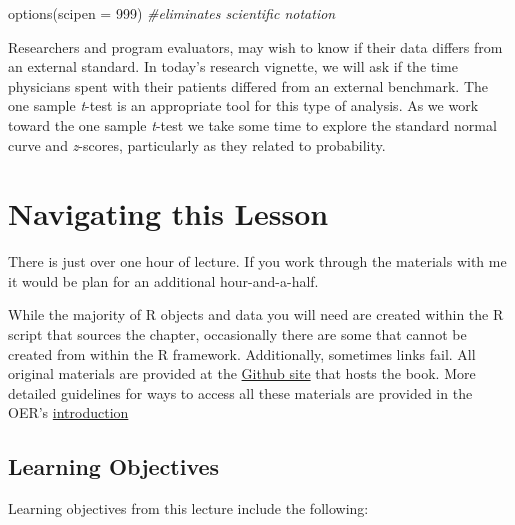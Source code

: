 \documentclass[
  11pt,
]{book}
\newenvironment{Shaded}{\begin{snugshade}}{\end{snugshade}}
\newcommand{\AttributeTok}[1]{\textcolor[rgb]{0.77,0.63,0.00}{#1}}
\newcommand{\CommentTok}[1]{\textcolor[rgb]{0.56,0.35,0.01}{\textit{#1}}}
\newcommand{\DecValTok}[1]{\textcolor[rgb]{0.00,0.00,0.81}{#1}}
\newcommand{\FunctionTok}[1]{\textcolor[rgb]{0.00,0.00,0.00}{#1}}
\newcommand{\NormalTok}[1]{#1}
\begin{document}
\begin{Shaded}
\begin{Highlighting}[]
\FunctionTok{options}\NormalTok{(}\AttributeTok{scipen =} \DecValTok{999}\NormalTok{)  }\CommentTok{\#eliminates scientific notation}
\end{Highlighting}
\end{Shaded}

Researchers and program evaluators, may wish to know if their data differs from an external standard. In today's research vignette, we will ask if the time physicians spent with their patients differed from an external benchmark. The one sample \emph{t}-test is an appropriate tool for this type of analysis. As we work toward the one sample \emph{t}-test we take some time to explore the standard normal curve and \emph{z}-scores, particularly as they related to probability.

\hypertarget{navigating-this-lesson-2}{%
\section{Navigating this Lesson}\label{navigating-this-lesson-2}}

There is just over one hour of lecture. If you work through the materials with me it would be plan for an additional hour-and-a-half.

While the majority of R objects and data you will need are created within the R script that sources the chapter, occasionally there are some that cannot be created from within the R framework. Additionally, sometimes links fail. All original materials are provided at the \href{https://github.com/lhbikos/ReCenterPsychStats}{Github site} that hosts the book. More detailed guidelines for ways to access all these materials are provided in the OER's \protect\hyperlink{ReCintro}{introduction}

\hypertarget{learning-objectives-2}{%
\subsection{Learning Objectives}\label{learning-objectives-2}}

Learning objectives from this lecture include the following:
\end{document}
